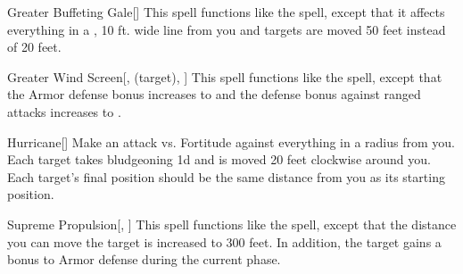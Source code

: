 \lowercase{\hypertarget{spell:Greater Buffeting Gale}{}}\label{spell:Greater Buffeting Gale}
\begin{freeability}[\nth{4}]{\hypertarget{spell:Greater Buffeting Gale}{Greater Buffeting Gale}}[]
This spell functions like the  spell, except that it affects everything in a \areahuge, 10 ft. wide line from you and targets are moved 50 feet instead of 20 feet.
\end{freeability}
\vspace{0.25em}



\lowercase{\hypertarget{spell:Greater Wind Screen}{}}\label{spell:Greater Wind Screen}
\begin{attuneability}[\nth{4}]{\hypertarget{spell:Greater Wind Screen}{Greater Wind Screen}}[,  (target), ]
This spell functions like the  spell, except that the Armor defense bonus increases to  and the defense bonus against ranged attacks increases to .
\end{attuneability}
\vspace{0.25em}



\lowercase{\hypertarget{spell:Hurricane}{}}\label{spell:Hurricane}
\begin{freeability}[\nth{4}]{\hypertarget{spell:Hurricane}{Hurricane}}[]
Make an attack vs. Fortitude against everything in a \arealarge radius from you.
\hit Each target takes bludgeoning  \minus1d and is moved 20 feet clockwise around you.
Each target's final position should be the same distance from you as its starting position.
\end{freeability}
\vspace{0.25em}



\lowercase{\hypertarget{spell:Supreme Propulsion}{}}\label{spell:Supreme Propulsion}
\begin{freeability}[\nth{4}]{\hypertarget{spell:Supreme Propulsion}{Supreme Propulsion}}[, ]
This spell functions like the  spell, except that the distance you can move the target is increased to 300 feet.
In addition, the target gains a  bonus to Armor defense during the current phase.
\end{freeability}
\vspace{0.25em}



